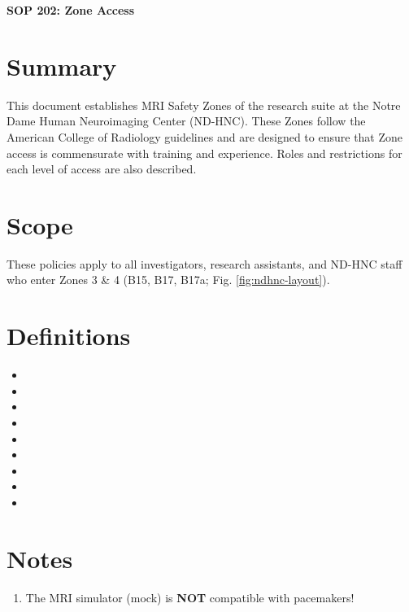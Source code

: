 \documentclass[11pt]{article}
\begin{document}
\renewcommand{\labelenumii}{\arabic{enumi}.\arabic{enumii}}
\renewcommand{\labelenumiii}{\arabic{enumi}.\arabic{enumii}.\arabic{enumiii}}
\renewcommand{\labelenumiv}{\arabic{enumi}.\arabic{enumii}.\arabic{enumiii}.\arabic{enumiv}}

\begin{center}
	\textbf{\Large SOP 202: Zone Access}\\
	\hrulefill
\end{center}


\section{Summary}
This document establishes MRI Safety Zones of the research suite at the Notre Dame Human Neuroimaging Center (ND-HNC). These Zones follow the American College of Radiology guidelines and are designed to ensure that Zone access is commensurate with training and experience. Roles and restrictions for each level of access are also described.


\section{Scope}
These policies apply to all investigators, research assistants, and ND-HNC staff who enter Zones 3 \& 4 (B15, B17, B17a; Fig. \ref{fig:ndhnc-layout}).


\section{Definitions}

\begin{itemize}
	\item \DcmComputer
	\item \ControlRoom
	\item \EEG
	\item \ElectronicLock
	\item \MagnetRoom
	\item \StimControl
	\item \Supervision
	\item \TMS
	\item \Visitor
\end{itemize}

\section{Notes}

\begin{enumerate}
	\item The MRI simulator (mock) is \textbf{NOT} compatible with pacemakers!
\end{enumerate}
\end{document}
